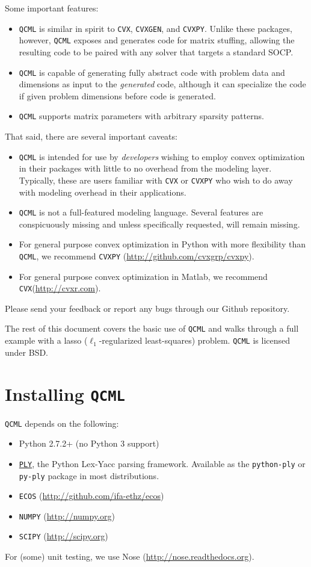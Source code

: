 \documentclass[11pt]{article}
\def\qcml{\texttt{QCML}\xspace}
\def\cvxpy{\texttt{CVXPY}\xspace}
\def\cvx{\texttt{CVX}\xspace}
\def\cvxgen{\texttt{CVXGEN}\xspace}
\begin{document}
Some important features:
\begin{itemize}
\item \qcml is similar in spirit to \cvx, \cvxgen, and 
\cvxpy. Unlike these packages, however, \qcml exposes and generates code
for matrix stuffing, allowing the resulting code to be paired with any solver
that targets a standard SOCP.
\item \qcml is capable of generating fully abstract code with problem data and
dimensions as input to the \emph{generated} code, although it can specialize
the code if given problem dimensions before code is generated.
\item \qcml supports matrix parameters with arbitrary sparsity patterns.
\end{itemize}
That said, there are several important caveats:
\begin{itemize}
\item \qcml is intended for use by \emph{developers} wishing to employ convex
optimization in their packages with little to no overhead from the modeling 
layer. Typically, these are users familiar with \cvx or \cvxpy who wish to
do away with modeling overhead in their applications.
\item \qcml is not a full-featured modeling language. Several features are
conspicuously missing and unless specifically requested, will remain missing.
\item For general purpose convex optimization in Python with more flexibility
than \qcml, we recommend \cvxpy 
(\url{http://github.com/cvxgrp/cvxpy}).
\item For general purpose convex optimization in Matlab, we recommend 
\cvx (\url{http://cvxr.com}).
\end{itemize}
Please send your feedback or report any bugs through our Github repository.

The rest of this document covers the basic use of \qcml and walks through a
full example with a lasso ($\ell_1$-regularized least-squares) problem. 
\qcml is licensed under BSD.

\newpage
\tableofcontents
\newpage

\section{Installing \qcml}
\qcml depends on the following:
\begin{itemize} 
\item Python 2.7.2+ (no Python 3 support)
\item \href{http://www.dabeaz.com/ply/}{\tt PLY}, the Python Lex-Yacc parsing framework.
  Available as the {\tt python-ply} or {\tt py-ply} package in most distributions.
\item {\tt ECOS} (\url{http://github.com/ifa-ethz/ecos})
\item {\tt NUMPY} (\url{http://numpy.org})
\item {\tt SCIPY} (\url{http://scipy.org})
\end{itemize}
For (some) unit testing, we use Nose (\url{http://nose.readthedocs.org}).
\end{document}
